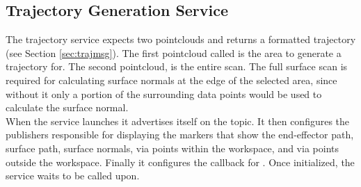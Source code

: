 \subsection{Trajectory Generation  Service}
The trajectory service expects two pointclouds and returns a  formatted trajectory (see Section \ref{sec:trajmsg}). The first pointcloud called  is the area to generate a trajectory for. The second pointcloud,  is the entire scan. The full surface scan is required for calculating surface normals at the edge of the selected area, since without it only a portion of the surrounding data points would be used to calculate the surface normal.\\

When the service launches it advertises itself on the  topic. It then configures the publishers responsible for displaying the markers that show the end-effector path, surface path, surface normals, via points within the workspace, and via points outside the workspace. Finally it configures the callback for . Once initialized, the service waits to be called upon.\\

